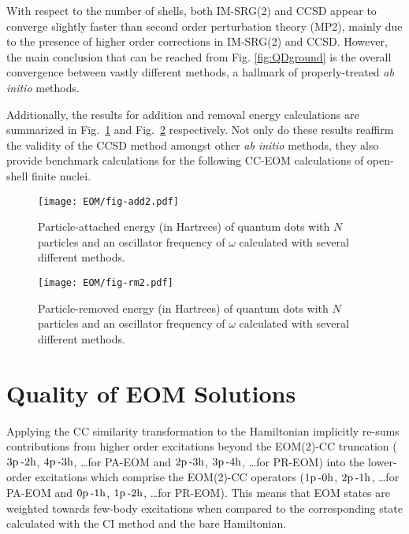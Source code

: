 \documentclass[thesis.tex]{subfiles}
\begin{document}
With respect to the number of shells, both IM-SRG(2) and CCSD appear to converge slightly faster than second order perturbation theory (MP2), mainly due to the presence of higher order corrections in IM-SRG(2) and CCSD.  However, the main conclusion that can be reached from Fig. \ref{fig:QDground} is the overall convergence between vastly different methods, a hallmark of properly-treated \emph{ab initio} methods.

Additionally, the results for addition and removal energy calculations are summarized in Fig.\ \ref{fig:QDadd} and Fig.\ \ref{fig:QDrm} respectively.  Not only do these results reaffirm the validity of the CCSD method amongst other \emph{ab initio} methods, they also provide benchmark calculations for the following CC-EOM calculations of open-shell finite nuclei.

\begin{figure}
  \centering
  \texttt{[image: EOM/fig-add2.pdf]}
  \caption{Particle-attached energy (in Hartrees) of quantum dots with $N$ particles and an oscillator frequency of $\omega$ calculated with several different methods.}
  \label{fig:QDadd}
\end{figure}

\begin{figure}
  \centering
  \texttt{[image: EOM/fig-rm2.pdf]}
  \caption{Particle-removed energy (in Hartrees) of quantum dots with $N$ particles and an oscillator frequency of $\omega$ calculated with several different methods.}
  \label{fig:QDrm}
\end{figure}


\section{Quality of EOM Solutions} \label{section:eom_quality}

Applying the CC similarity transformation to the Hamiltonian implicitly re-sums contributions from higher order excitations beyond the EOM(2)-CC truncation ($3\mathrm{p}\hspace{2pt}\text{-}2\mathrm{h}$, $4\mathrm{p}\hspace{2pt}\text{-}3\mathrm{h}$, \ldots for PA-EOM and $2\mathrm{p}\hspace{2pt}\text{-}3\mathrm{h}$, $3\mathrm{p}\hspace{2pt}\text{-}4\mathrm{h}$, \ldots for PR-EOM) into the lower-order excitations which comprise the EOM(2)-CC operators ($1\mathrm{p}\hspace{2pt}\text{-}0\mathrm{h}$, $2\mathrm{p}\hspace{2pt}\text{-}1\mathrm{h}$, \ldots for PA-EOM and $0\mathrm{p}\hspace{2pt}\text{-}1\mathrm{h}$, $1\mathrm{p}\hspace{2pt}\text{-}2\mathrm{h}$, \ldots for PR-EOM).  This means that EOM states are weighted towards few-body excitations when compared to the corresponding state calculated with the CI method and the bare Hamiltonian.
\end{document}
